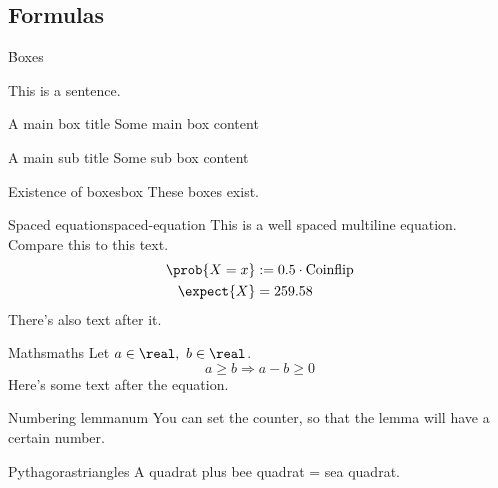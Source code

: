 \def\lutilpath{../..}







\begin{multicols*}{3}

  \part{Formulas}

  \h{Boxes}


  This is a sentence.

  \begin{mainbox}{A main box title}
    Some main box content
  \end{mainbox}

  \begin{subbox}{A main sub title}
    Some sub box content
  \end{subbox}


  \begin{axiom}{Existence of boxes}{box}
    These boxes exist.
  \end{axiom}

  \begin{definition}{Spaced equation}{spaced-equation}
    This is a well spaced multiline equation. Compare this to this text.
    \begin{align*}
      \prob{X = x} & := 0.5 \cdot \text{Coinflip} \\
      \expect{X} & = 259.58
    \end{align*}
    There's also text after it.
  \end{definition}

  \begin{corollary}{Maths}{maths}
    Let $a \in \real,\ b \in \real$.
    \[
      a \geq b \Rightarrow a - b \geq 0
    \]
    Here's some text after the equation.
  \end{corollary}

  \begin{lemma}{Numbering lemma}{num}
    You can set the counter, so that the lemma will have a certain number.
  \end{lemma}

  \begin{satz}{Pythagoras}{triangles}
    A quadrat plus bee quadrat = sea quadrat.
  \end{satz}


\end{multicols*}
